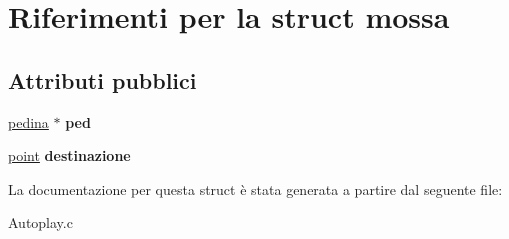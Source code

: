 \hypertarget{structmossa}{}\section{Riferimenti per la struct mossa}
\label{structmossa}
\subsection*{Attributi pubblici}
\begin{DoxyCompactItemize}
\item 
\mbox{\label{structmossa_afe4beff88f7c04c14310d6c24c126419}} 
\hyperlink{ml__lib_8h_a71fee95122b31f5cb0b07d9c16ffa3a5}{pedina} $\ast$ {\bfseries ped}
\item 
\mbox{\label{structmossa_a0d6a6b2ff44a4367e3ccbaa8213d5b11}} 
\hyperlink{structpunto}{point} {\bfseries destinazione}
\end{DoxyCompactItemize}


La documentazione per questa struct è stata generata a partire dal seguente file\+:\begin{DoxyCompactItemize}
\item 
Autoplay.\+c\end{DoxyCompactItemize}
